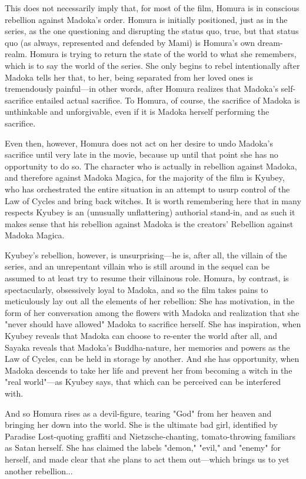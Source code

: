 This does not necessarily imply that, for most of the film, Homura is in conscious rebellion against Madoka's order. Homura is initially positioned, just as in the series, as the one questioning and disrupting the status quo, true, but that status quo (as always, represented and defended by Mami) is Homura's own dream-realm. Homura is trying to return the state of the world to what she remembers, which is to say the world of the series. She only begins to rebel intentionally after Madoka tells her that, to her, being separated from her loved ones is tremendously painful—in other words, after Homura realizes that Madoka's self-sacrifice entailed actual sacrifice. To Homura, of course, the sacrifice of Madoka is unthinkable and unforgivable, even if it is Madoka herself performing the sacrifice.

Even then, however, Homura does not act on her desire to undo Madoka's sacrifice until very late in the movie, because up until that point she has no opportunity to do so. The character who is actually in rebellion against Madoka, and therefore against Madoka Magica, for the majority of the film is Kyubey, who has orchestrated the entire situation in an attempt to usurp control of the Law of Cycles and bring back witches. It is worth remembering here that in many respects Kyubey is an (unusually unflattering) authorial stand-in, and as such it makes sense that his rebellion against Madoka is the creators' Rebellion against Madoka Magica.

Kyubey's rebellion, however, is unsurprising—he is, after all, the villain of the series, and an unrepentant villain who is still around in the sequel can be assumed to at least try to resume their villainous role. Homura, by contrast, is spectacularly, obsessively loyal to Madoka, and so the film takes pains to meticulously lay out all the elements of her rebellion: She has motivation, in the form of her conversation among the flowers with Madoka and realization that she "never should have allowed" Madoka to sacrifice herself. She has inspiration, when Kyubey reveals that Madoka can choose to re-enter the world after all, and Sayaka reveals that Madoka's Buddha-nature, her memories and powers as the Law of Cycles, can be held in storage by another. And she has opportunity, when Madoka descends to take her life and prevent her from becoming a witch in the "real world"—as Kyubey says, that which can be perceived can be interfered with.

And so Homura rises as a devil-figure, tearing "God" from her heaven and bringing her down into the world. She is the ultimate bad girl, identified by Paradise Lost-quoting graffiti and Nietzsche-chanting, tomato-throwing familiars as Satan herself. She has claimed the labels "demon," "evil," and "enemy" for herself, and made clear that she plans to act them out—which brings us to yet another rebellion...
